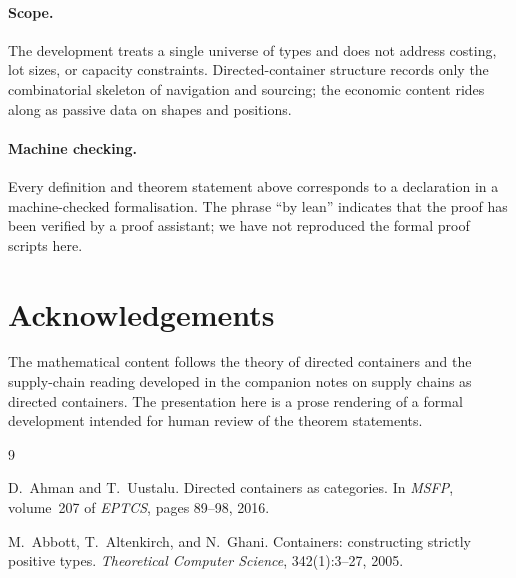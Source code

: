 \documentclass[11pt,a4paper]{article}
\theoremstyle{plain}
\theoremstyle{definition}
\begin{document}
\paragraph{Scope.}
The development treats a single universe of types and does not address
costing, lot sizes, or capacity constraints. Directed-container structure
records only the combinatorial skeleton of navigation and sourcing; the
economic content rides along as passive data on shapes and positions.

\paragraph{Machine checking.}
Every definition and theorem statement above corresponds to a declaration
in a machine-checked formalisation. The phrase ``by lean'' indicates that
the proof has been verified by a proof assistant; we have not reproduced
the formal proof scripts here.

\section*{Acknowledgements}

The mathematical content follows the theory of directed containers and
the supply-chain reading developed in the companion notes on supply chains
as directed containers. The presentation here is a prose rendering of a
formal development intended for human review of the theorem statements.

\begin{thebibliography}{9}

D.~Ahman and T.~Uustalu.
\newblock Directed containers as categories.
\newblock In \emph{MSFP}, volume~207 of \emph{EPTCS}, pages 89--98, 2016.

M.~Abbott, T.~Altenkirch, and N.~Ghani.
\newblock Containers: constructing strictly positive types.
\newblock \emph{Theoretical Computer Science}, 342(1):3--27, 2005.

\end{thebibliography}
\end{document}
